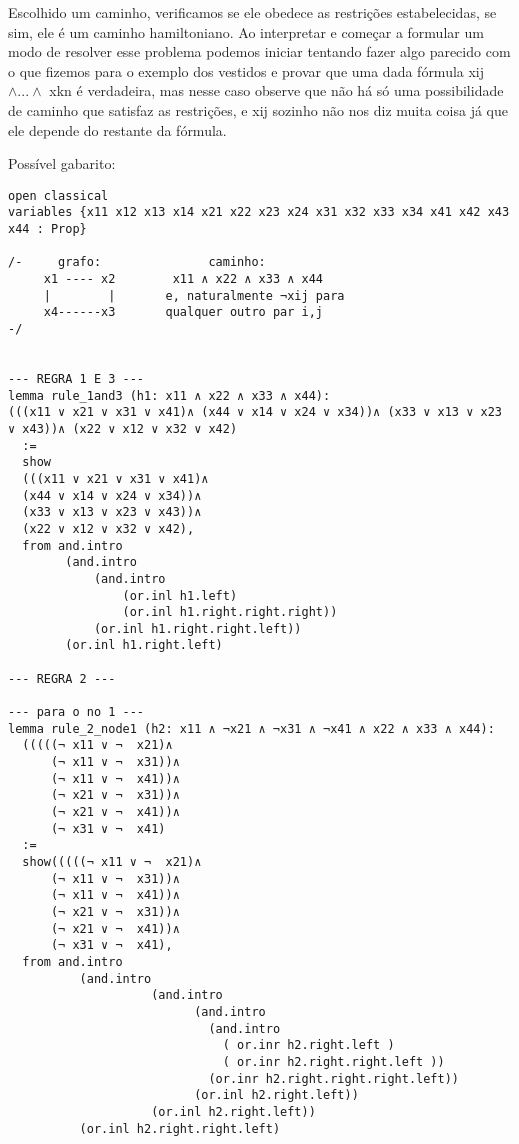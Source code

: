 \begin{enumerate}
Escolhido um caminho, verificamos se ele obedece as restrições estabelecidas, se sim, ele é um caminho hamiltoniano. Ao interpretar e começar a formular um modo de resolver esse problema podemos iniciar tentando fazer algo parecido com o que fizemos para o exemplo dos vestidos e provar que uma dada fórmula xij $\land ... \land$ xkn é verdadeira, mas nesse caso observe que não há só uma possibilidade de caminho que satisfaz as restrições, e xij sozinho não nos diz muita coisa já que ele depende do restante da fórmula.

\bigbreak
Possível gabarito:
\begin{lstlisting}
open classical 
variables {x11 x12 x13 x14 x21 x22 x23 x24 x31 x32 x33 x34 x41 x42 x43 x44 : Prop}

/-     grafo:               caminho:
     x1 ---- x2        x11 ∧ x22 ∧ x33 ∧ x44         
     |        |       e, naturalmente ¬xij para
     x4------x3       qualquer outro par i,j          
-/


--- REGRA 1 E 3 ---
lemma rule_1and3 (h1: x11 ∧ x22 ∧ x33 ∧ x44):
(((x11 ∨ x21 ∨ x31 ∨ x41)∧ (x44 ∨ x14 ∨ x24 ∨ x34))∧ (x33 ∨ x13 ∨ x23 ∨ x43))∧ (x22 ∨ x12 ∨ x32 ∨ x42)
  :=
  show 
  (((x11 ∨ x21 ∨ x31 ∨ x41)∧ 
  (x44 ∨ x14 ∨ x24 ∨ x34))∧
  (x33 ∨ x13 ∨ x23 ∨ x43))∧
  (x22 ∨ x12 ∨ x32 ∨ x42), 
  from and.intro 
        (and.intro 
            (and.intro 
                (or.inl h1.left)
                (or.inl h1.right.right.right))
            (or.inl h1.right.right.left))
        (or.inl h1.right.left)

--- REGRA 2 ---

--- para o no 1 ---
lemma rule_2_node1 (h2: x11 ∧ ¬x21 ∧ ¬x31 ∧ ¬x41 ∧ x22 ∧ x33 ∧ x44):
  (((((¬ x11 ∨ ¬  x21)∧
      (¬ x11 ∨ ¬  x31))∧ 
      (¬ x11 ∨ ¬  x41))∧ 
      (¬ x21 ∨ ¬  x31))∧ 
      (¬ x21 ∨ ¬  x41))∧ 
      (¬ x31 ∨ ¬  x41)
  :=
  show(((((¬ x11 ∨ ¬  x21)∧
      (¬ x11 ∨ ¬  x31))∧ 
      (¬ x11 ∨ ¬  x41))∧ 
      (¬ x21 ∨ ¬  x31))∧ 
      (¬ x21 ∨ ¬  x41))∧ 
      (¬ x31 ∨ ¬  x41),
  from and.intro
          (and.intro
                    (and.intro
                          (and.intro
                            (and.intro
                              ( or.inr h2.right.left ) 
                              ( or.inr h2.right.right.left ))
                            (or.inr h2.right.right.right.left))
                          (or.inl h2.right.left))
                    (or.inl h2.right.left))
          (or.inl h2.right.right.left)


\end{lstlisting}
\end{enumerate}
